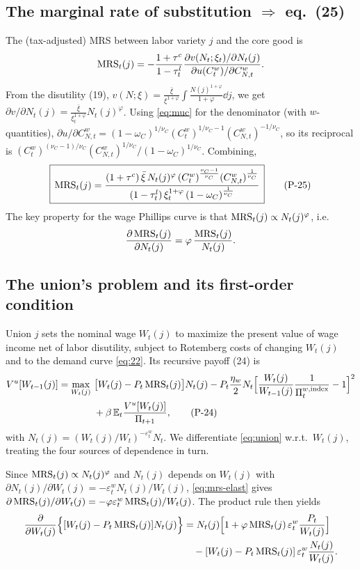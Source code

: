 \subsection{The marginal rate of substitution \texorpdfstring{$\Rightarrow$}{=>} eq.\ (25)}
The (tax-adjusted) MRS between labor variety $j$ and the core good is
\[
\operatorname{MRS}_t(j)=-\frac{1+\tau^c}{1-\tau^l_t}\frac{\partial v(N_t;\xi_t)/\partial N_t(j)}{\partial u(C^w_t)/\partial C^w_{N,t}} .
\]
From the disutility (19), $v(N;\xi)=\frac{\bar\xi}{\xi^{1+\varphi}}\int\frac{N(j)^{1+\varphi}}{1+\varphi}\dd j$,
we get $\partial v/\partial N_t(j)=\frac{\bar\xi}{\xi_t^{1+\varphi}}N_t(j)^\varphi$. Using \eqref{eq:muc}
for the denominator (with $w$-quantities), $\partial u/\partial C^w_{N,t}
=(1-\omega_C)^{1/\nu_C}(C^w_t)^{1/\nu_C-1}(C^w_{N,t})^{-1/\nu_C}$, so its reciprocal is
$(C^w_t)^{(\nu_C-1)/\nu_C}(C^w_{N,t})^{1/\nu_C}/(1-\omega_C)^{1/\nu_C}$. Combining,
\begin{equation}\label{eq:25}
\boxed{\,\operatorname{MRS}_t(j)=\frac{(1+\tau^c)\,\bar\xi\,N_t(j)^\varphi\,(C^w_t)^{\frac{\nu_C-1}{\nu_C}}(C^w_{N,t})^{\frac1{\nu_C}}}
{(1-\tau^l_t)\,\xi_t^{1+\varphi}\,(1-\omega_C)^{\frac1{\nu_C}}}\,}\tag{P-25}
\end{equation}
The key property for the wage Phillips curve is that $\operatorname{MRS}_t(j)\propto N_t(j)^{\varphi}$, i.e.
\begin{equation}\label{eq:mrs-elast}
\frac{\partial \operatorname{MRS}_t(j)}{\partial N_t(j)}=\varphi\,\frac{\operatorname{MRS}_t(j)}{N_t(j)} .
\end{equation}

\subsection{The union's problem and its first-order condition}
Union $j$ sets the nominal wage $W_t(j)$ to maximize the present value of wage income net of labor
disutility, subject to Rotemberg costs of changing $W_t(j)$ and to the demand curve \eqref{eq:22}. Its
recursive payoff (24) is
\begin{align}
V^u[W_{t-1}(j)]=\max_{W_t(j)}\ &\big[W_t(j)-P_t\operatorname{MRS}_t(j)\big]N_t(j)
-P_t\frac{\eta_w}{2}N_t\Big[\frac{W_t(j)}{W_{t-1}(j)}\frac{1}{\Pi^{w,\text{index}}_t}-1\Big]^2\nonumber\\
&+\beta\,\mathbb{E}_t\frac{V^u[W_t(j)]}{\Pi_{t+1}},\tag{P-24}\label{eq:union}
\end{align}
with $N_t(j)=(W_t(j)/W_t)^{-\varepsilon^w_t}N_t$. We differentiate \eqref{eq:union} w.r.t.\ $W_t(j)$,
treating the four sources of dependence in turn.

Since $\operatorname{MRS}_t(j)\propto N_t(j)^\varphi$ and $N_t(j)$ depends on $W_t(j)$ with
$\partial N_t(j)/\partial W_t(j)=-\varepsilon^w_t N_t(j)/W_t(j)$, \eqref{eq:mrs-elast} gives
$\partial\operatorname{MRS}_t(j)/\partial W_t(j)=-\varphi\varepsilon^w_t\operatorname{MRS}_t(j)/W_t(j)$. The product rule then yields
\begin{align*}
\frac{\partial }{\partial W_t(j)}\Big\{[W_t(j)-P_t\operatorname{MRS}_t(j)]N_t(j)\Big\}
&=N_t(j)\Big[1+\varphi\operatorname{MRS}_t(j)\,\varepsilon^w_t\frac{P_t}{W_t(j)}\Big]\\
&\quad-[W_t(j)-P_t\operatorname{MRS}_t(j)]\,\varepsilon^w_t\frac{N_t(j)}{W_t(j)} .
\end{align*}

